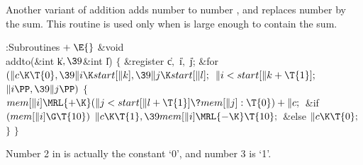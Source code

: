 Another variant of addition adds number  to number
,
and replaces number  by the sum. This routine is used only
when  is large enough to contain the
sum.

\Y\B\4:Subroutines\X${}\mathrel+\E{}$\6
\&{void} \\{addto}(\&{int} \|k${},\39{}$\&{int} \|l)\1\1\2\2\6
${}\{{}$\1\6
\&{register} \|c${},{}$ \|i${},{}$ \|j;\7
\&{for} ${}(\|c\K\T{0},\39\|i\K\\{start}[\|k],\39\|j\K\\{start}[\|l];{}$ ${}%
\|i<\\{start}[\|k+\T{1}];{}$ ${}\|i\PP,\39\|j\PP){}$\5
${}\{{}$\1\6
${}\\{mem}[\|i]\MRL{+{\K}}(\|j<\\{start}[\|l+\T{1}]\?\\{mem}[\|j]:\T{0})+%
\|c;{}$\6
\&{if} ${}(\\{mem}[\|i]\G\T{10}){}$\1\5
${}\|c\K\T{1},\39\\{mem}[\|i]\MRL{-{\K}}\T{10};{}$\2\6
\&{else}\1\5
${}\|c\K\T{0};{}$\2\6
\4${}\}{}$\2\6
\4${}\}{}$\2\par
\fi

Number 2 in  is actually the constant `0', and
number 3 is `1'.

